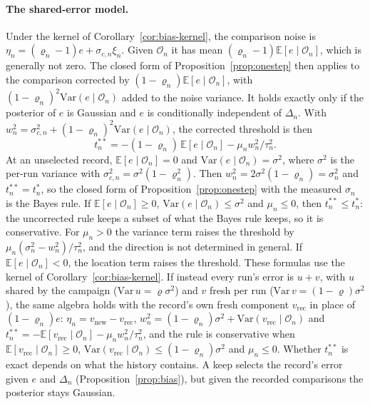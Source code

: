 \paragraph{The shared-error model.}
Under the kernel of Corollary~\ref{cor:bias-kernel}, the comparison noise is $\eta_n=(\varrho_n-1)e+\sigma_{c,n}\xi_n$. Given $\mathcal{O}_n$ it has mean $(\varrho_n-1)\mathbb{E}[e\mid\mathcal{O}_n]$, which is generally not zero. The closed form of Proposition~\ref{prop:onestep} then applies to the comparison corrected by $(1-\varrho_n)\mathbb{E}[e\mid\mathcal{O}_n]$, with $(1-\varrho_n)^2\mathrm{Var}(e\mid\mathcal{O}_n)$ added to the noise variance. It holds exactly only if the posterior of $e$ is Gaussian and $e$ is conditionally independent of $\Delta_n$.
With $w_n^2=\sigma_{c,n}^2+(1-\varrho_n)^2\mathrm{Var}(e\mid\mathcal{O}_n)$, the corrected threshold is then
\[
t^{**}_n=-(1-\varrho_n)\,\mathbb{E}[e\mid\mathcal{O}_n]-\mu_n w_n^2/\tau_n^2 .
\]
At an unselected record, $\mathbb{E}[e\mid\mathcal{O}_n]=0$ and $\mathrm{Var}(e\mid\mathcal{O}_n)=\sigma^2$, where $\sigma^2$ is the per-run variance with $\sigma_{c,n}^2=\sigma^2(1-\varrho_n^2)$. Then $w_n^2=2\sigma^2(1-\varrho_n)=\sigma_n^2$ and $t^{**}_n=t^*_n$, so the closed form of Proposition~\ref{prop:onestep} with the measured $\sigma_n$ is the Bayes rule. If $\mathbb{E}[e\mid\mathcal{O}_n]\ge0$, $\mathrm{Var}(e\mid\mathcal{O}_n)\le\sigma^2$ and $\mu_n\le0$, then $t^{**}_n\le t^*_n$: the uncorrected rule keeps a subset of what the Bayes rule keeps, so it is conservative. For $\mu_n>0$ the variance term raises the threshold by $\mu_n(\sigma_n^2-w_n^2)/\tau_n^2$, and the direction is not determined in general. If $\mathbb{E}[e\mid\mathcal{O}_n]<0$, the location term raises the threshold.
These formulas use the kernel of Corollary~\ref{cor:bias-kernel}. If instead every run's error is $u+v$, with $u$ shared by the campaign ($\mathrm{Var}\,u=\varrho\sigma^2$) and $v$ fresh per run ($\mathrm{Var}\,v=(1-\varrho)\sigma^2$), the same algebra holds with the record's own fresh component $v_{\mathrm{rec}}$ in place of $(1-\varrho_n)e$: $\eta_n=v_{\mathrm{new}}-v_{\mathrm{rec}}$, $w_n^2=(1-\varrho_n)\sigma^2+\mathrm{Var}(v_{\mathrm{rec}}\mid\mathcal{O}_n)$ and $t^{**}_n=-\mathbb{E}[v_{\mathrm{rec}}\mid\mathcal{O}_n]-\mu_nw_n^2/\tau_n^2$, and the rule is conservative when $\mathbb{E}[v_{\mathrm{rec}}\mid\mathcal{O}_n]\ge0$, $\mathrm{Var}(v_{\mathrm{rec}}\mid\mathcal{O}_n)\le(1-\varrho_n)\sigma^2$ and $\mu_n\le0$. %
Whether $t^{**}_n$ is exact depends on what the history contains. A keep selects the record's error given $e$ and $\Delta_n$ (Proposition~\ref{prop:bias}), but given the recorded comparisons the posterior stays Gaussian.

